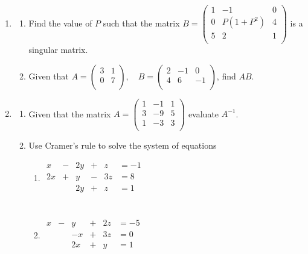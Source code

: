 \documentclass[11pt,a4paper]{article}
\theoremstyle{definition}
\begin{document}
\begin{enumerate}
\item
\begin{enumerate}
\item Find the value of $P$ such that the matrix $B=
\begin{pmatrix}
1 & -1 & 0\\
0 & P(1 +P^2) & 4\\
5 & 2 & 1\\
\end{pmatrix}
$ is a singular matrix.\\

\item Given that $ A=
\begin{pmatrix}
3 & 1\\
0 & 7\\
\end{pmatrix}
, \quad 
B=
\begin{pmatrix}
2 & -1 & 0\\
4 & 6 & -1\\
\end{pmatrix}
$, find $AB$.\\
\end{enumerate}

\item
\begin{enumerate}
\item Given that the matrix $A=
\begin{pmatrix}
1 & -1 & 1\\
3 & -9 & 5\\
1 & -3 & 3\\
\end{pmatrix}
$ evaluate $A^{-1}$.\\

\item Use Cramer's rule to solve the system of equations 
\begin{enumerate}
\item \quad 
$
\begin{matrix}
x & - & 2y & + & z & =-1\\
2x & + & y & - & 3z & = 8\\
&& 2y & + & z & =1\\
\end{matrix}
$\\\\

\item \quad 
$
\begin{matrix}
x & - & y & + & 2z & =-5\\
&&-x & + & 3z & =0\\
&& 2x & + & y & = 1\\
\end{matrix}
$\\\\
\end{enumerate}
\end{enumerate}




\end{enumerate}
\end{document}
